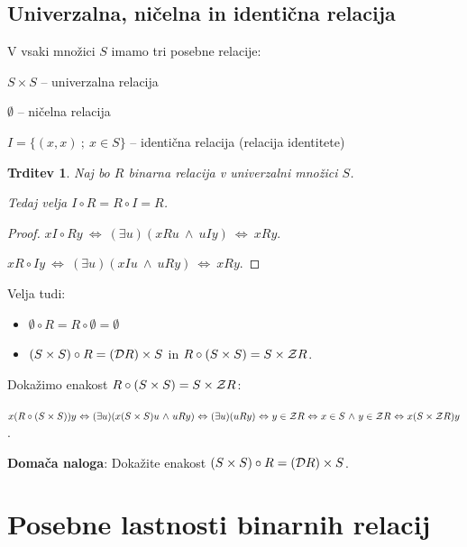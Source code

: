 \documentclass[11pt,paper=b5,footinclude,headinclude]{scrbook} %
\def\inn {{~\wedge~}}
\def\cee {{~\Leftrightarrow~}}
\newtheorem*{trditev}{Trditev}
\begin{document}

\subsection{Univerzalna, ničelna in identična relacija}

V vsaki množici $S$ imamo tri posebne relacije:

$S\times S$ -- univerzalna relacija

$\emptyset$ -- ničelna relacija

$I = \{(x,x)~;~x\in S\}$ -- identična relacija (relacija identitete)

\begin{trditev}
Naj bo $R$ binarna relacija v univerzalni množici $S$.

Tedaj velja $I\circ R = R\circ I = R$.
\end{trditev}

\begin{proof}
$xI\circ Ry \cee (\exists u)(xRu \inn uIy) \cee xRy$.

$xR\circ Iy \cee (\exists u)(xIu \inn uRy) \cee xRy$.
\end{proof}

\medskip
Velja tudi:

\begin{itemize}
  \item $\emptyset \circ R = R\circ \emptyset = \emptyset$
  \item $(S\times S)\circ R =
({\cal D}R) \times S$ in $R\circ (S\times S) = S\times {\cal Z}R$.
\end{itemize}

Dokažimo enakost $R\circ (S\times S) = S\times {\cal Z}R$:

$x(R\circ (S\times S))y \cee (\exists u)(x(S\times S)u \inn uRy)
\cee (\exists u)(uRy) \cee y\in {\cal Z}R \cee x\in S\inn y\in {\cal Z}R  \cee x(S\times {\cal Z}R)y$.

\bigskip

\textbf{ Domača naloga}: Dokažite enakost
$(S\times S)\circ R = ({\cal D}R) \times S$.


\section{Posebne lastnosti binarnih relacij}
\end{document}
